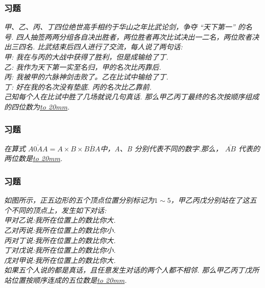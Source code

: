 \begin{frame}
    \frametitle{习题\theframecounter}
    \vspace*{-1cm}
    \textit{甲、乙、丙、丁四位绝世高手相约于华山之年比武论剑，争夺 ``天下第一'' 的名号. 四人抽签两两分组各自决出胜者，两位胜者再次比试决出一二名，两位败者决出三四名. 比武结束后四人进行了交流，每人说了两句话:\\
    甲: 我在与丙的大战中获得了胜利，但是成输给了丁.\\
    乙: 我作为天下第一实至名归，甲的名次比丙靠后.\\
    丙: 我被甲的六脉神剑击败了。乙在比试中输给了丁.\\
    丁: 好在我的名次没有垫底. 丙的名次比乙靠前.\\
    己知每个人在比试中胜了几场就说几句真话. 那么甲乙丙丁最终的名次按顺序组成的四位数为\underline{\hbox to 20mm{}}.}
\end{frame}


\begin{frame}
    \frametitle{习题\theframecounter}
    \vspace*{-3cm}
    \textit{在算式 $\overline{A0AA}= A\times B\times \overline{BBA}$中，A、B 分别代表不同的数字.那么， $\overline{AB}$ 代表的两位数是\underline{\hbox to 20mm{}}.}
\end{frame}


\begin{frame}
    \frametitle{习题\theframecounter}
    \vspace*{-1cm}
    \textit{如图所示，正五边形的五个顶点位置分别标记为$1\sim 5$，甲乙丙戊分别站在了这五个不同的顶点上，发生如下对话:\\
甲对乙说:我所在位置上的数比你大. \\
乙对丙说:我所在位置上的数比你小. \\
丙对丁说:我所在位置上的数比你大. \\
丁对戊说:我所在位置上的数比你小. \\
戊对甲说:我所在位置上的数比你大. \\
如果五个人说的都是真话，且任意发生对话的两个人都不相邻. 那么甲乙丙丁戊所站位置按顺序连成的五位数是\underline{\hbox to 20mm{}}.}
\end{frame}


